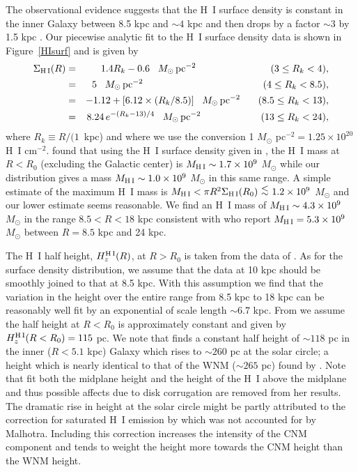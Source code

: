 \documentclass[12pt,preprint,flushrt]{aastex}
\newcommand{\al}{\mbox{ \raisebox{-.4ex}{$\stackrel{\textstyle <}{\sim}$} }}
\begin{document}
The observational evidence suggests that the H~I surface density
is constant in the inner Galaxy between 8.5 kpc and $\sim 4$ kpc
and then drops by a factor $\sim 3$ by 1.5 kpc
\citep{dic90,lis92,dam93}.
Our piecewise analytic fit to the H~I surface density data
is shown in Figure~\ref{HIsurf} and is given by
\begin{eqnarray}
\Sigma_{\rm H\,I}(R) & = & 1.4 R_k - 0.6 \,\,\,\,\,
           M_\odot \, {\rm pc}^{-2} \,\,\,\,\,
                   \,\,\,\,\,~~~~~~~~~~~~~~~~~~  (3\le  R_k < 4),
\label{eq:h1surf1} \\
   & = & 5 \,\,\,\,\,
           M_\odot \, {\rm pc}^{-2} \,\,\,\,\,
           \,\,\,\,\, ~~~~~~~~~~~~~~~~~~~~~~~~~~~~~~~~ (4\le  R_k < 8.5),\\
   & = & -1.12 + [6.12\times (R_k/8.5)] \,\,\,\,\,
             M_\odot \, {\rm pc}^{-2}\,\,\,\,\,
         \,\,\,\,\,\,  (8.5 \le R_k < 13),\\
    & = & 8.24 \,{e}^{-(R_k-13)/4}\,\,\,\,\,
              M_\odot \, {\rm pc}^{-2}  \,\,\,\,\,
         \,\,\,\,\  ~~~~~~~~~~~~~(13 \le R_k < 24),
\label{eq:h1surf4}
\end{eqnarray}
where $R_k\equiv R/(1$~kpc) and where
we use the conversion 1 $M_\odot$ pc$^{-2} = 1.25\times 10^{20}$
H~I cm$^{-2}$. \cite{dam93} found that using the H~I surface density given
in \cite{lis92}, the H~I mass at $R < R_0$ (excluding the Galactic
center) is $M_{\rm H\, I}\sim 1.7\times 10^{9}$ $M_\odot$ while
our distribution gives a mass $M_{\rm H\, I}\sim 1.0\times 10^9$ $M_\odot$
in this same range. A simple estimate of the maximum H~I mass
is $M_{\rm H\, I} < \pi R^2 \Sigma_{\rm H\, I}(R_0) \al 1.2 \times 10^9$
$M_\odot$ and our lower estimate seems reasonable. We find an H~I mass
of $M_{\rm H\, I}\sim 4.3\times 10^9$ $M_\odot$ in the range $8.5 < R < 18$ kpc
consistent with \cite{wou90} who report
$M_{\rm H\, I} = 5.3\times 10^{9}$ $M_\odot$  between $R=8.5$ kpc and 24 kpc.

The H~I half height, $H_z^{\rm H\, I}(R)$, at $R > R_0$
is taken from the data of \cite{wou90}.
As for
the surface density distribution, we assume that the data
at 10 kpc should be smoothly joined to that at 8.5 kpc. With this assumption
we find that the variation in the height over the entire
range from 8.5 kpc to 18 kpc can be reasonably well fit by an
exponential of scale length $\sim 6.7$ kpc.
From \cite{dic90} we assume the half height at
$R < R_0$ is approximately constant
and given by  $H_z^{\rm H\, I}(R < R_0 ) = 115$ pc.
We note that \cite{mal95} finds a constant half height of
$\sim 118$ pc  in the inner ($R < 5.1$ kpc) Galaxy which rises
to $\sim 260$ pc at the solar circle; a height which
is nearly identical to that of the WNM ($\sim 265$ pc)
found by \cite{dic90}.  Note that \cite{mal95} fit both the
midplane height and the height of the H~I above the midplane and thus
possible affects due to disk corrugation are removed from her results.
The dramatic rise in height at the solar circle might
be partly  attributed to the correction for saturated
H~I emission by \cite{dic90} which was not
accounted for by Malhotra. Including this correction
increases the intensity of the CNM component and
tends to weight the height more towards the CNM height
than the WNM height.
\end{document}
